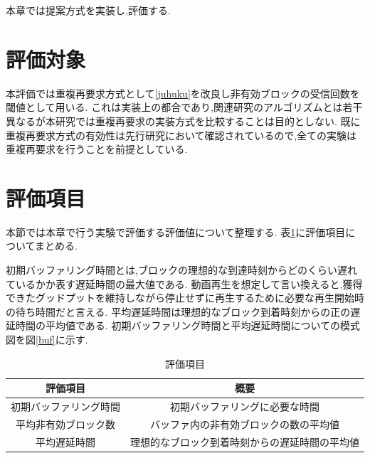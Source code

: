 \documentclass[a4j,12pt]{gradthesis_utf8}
\begin{document}
本章では提案方式を実装し,評価する.

\section{評価対象}
本評価では重複再要求方式として\ref{juhuku}を改良し非有効ブロックの受信回数を閾値として用いる.
これは実装上の都合であり,関連研究のアルゴリズムとは若干異なるが本研究では重複再要求の実装方式を比較することは目的としない.
既に重複再要求方式の有効性は先行研究において確認されているので,全ての実験は重複再要求を行うことを前提としている.

\section{評価項目}
\label{hyoukakoumoku}
本節では本章で行う実験で評価する評価値について整理する.
表\ref{hyoka}に評価項目についてまとめる.

初期バッファリング時間とは,ブロックの理想的な到達時刻からどのくらい遅れているかか表す遅延時間の最大値である.
動画再生を想定して言い換えると,獲得できたグッドプットを維持しながら停止せずに再生するために必要な再生開始時の待ち時間だと言える.
平均遅延時間は理想的なブロック到着時刻からの正の遅延時間の平均値である.
初期バッファリング時間と平均遅延時間についての模式図を図\ref{buf}に示す.

\newpage

\begin{table}[htb]
	\begin{center}
		\caption{評価項目}
		\label{hyoka}
		\begin{tabular}{|c|c|} \hline
			評価項目 & 概要　\\ \hline \hline
			初期バッファリング時間 & 初期バッファリングに必要な時間 \\ \hline
			平均非有効ブロック数 & バッファ内の非有効ブロックの数の平均値 \\ \hline
			平均遅延時間 & 理想的なブロック到着時刻からの遅延時間の平均値 \\ \hline
		\end{tabular}
	\end{center}
\end{table}
\end{document}
